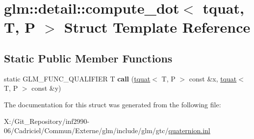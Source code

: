 \hypertarget{structglm_1_1detail_1_1compute__dot_3_01tquat_00_01_t_00_01_p_01_4}{\section{glm\-:\-:detail\-:\-:compute\-\_\-dot$<$ tquat, T, P $>$ Struct Template Reference}
\label{structglm_1_1detail_1_1compute__dot_3_01tquat_00_01_t_00_01_p_01_4}
}
\subsection*{Static Public Member Functions}
\begin{DoxyCompactItemize}
\item 
\hypertarget{structglm_1_1detail_1_1compute__dot_3_01tquat_00_01_t_00_01_p_01_4_a4f27c293f2e5e43f23e019303336601e}{static G\-L\-M\-\_\-\-F\-U\-N\-C\-\_\-\-Q\-U\-A\-L\-I\-F\-I\-E\-R T {\bfseries call} (\hyperlink{structglm_1_1detail_1_1tquat}{tquat}$<$ T, P $>$ const \&x, \hyperlink{structglm_1_1detail_1_1tquat}{tquat}$<$ T, P $>$ const \&y)}\label{structglm_1_1detail_1_1compute__dot_3_01tquat_00_01_t_00_01_p_01_4_a4f27c293f2e5e43f23e019303336601e}

\end{DoxyCompactItemize}


The documentation for this struct was generated from the following file\-:\begin{DoxyCompactItemize}
\item 
X\-:/\-Git\-\_\-\-Repository/inf2990-\/06/\-Cadriciel/\-Commun/\-Externe/glm/include/glm/gtc/\hyperlink{glm_2include_2glm_2gtc_2quaternion_8inl}{quaternion.\-inl}\end{DoxyCompactItemize}
